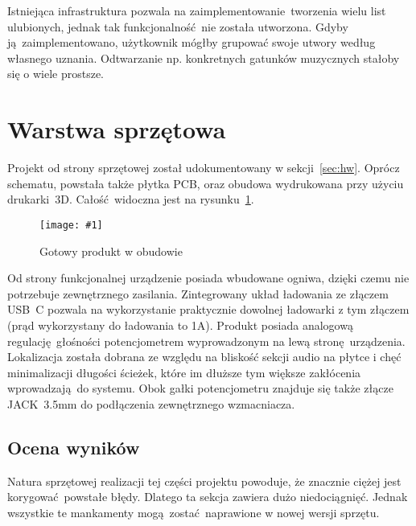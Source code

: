\documentclass[polish]{aghengthesis}
\newcommand{\imgint}[4]{
	\begin{figure}[{#4}]
		\centering
		\texttt{[image: \#1]}
		\caption{#2}
		\label{#1}
	\end{figure}
}
\newcommand{\imgh}[3]{\imgint{#1}{#2}{#3}{H}}
\begin{document}
			Istniejąca infrastruktura pozwala na zaimplementowanie tworzenia wielu list ulubionych, jednak tak funkcjonalność nie została utworzona. Gdyby ją zaimplementowano, użytkownik mógłby grupować swoje utwory według własnego uznania. Odtwarzanie np. konkretnych gatunków muzycznych stałoby się o wiele prostsze.
			
	\section{Warstwa sprzętowa}
		Projekt od strony sprzętowej został udokumentowany w sekcji~\ref{sec:hw}. Oprócz schematu, powstała także płytka PCB, oraz obudowa wydrukowana przy użyciu drukarki~3D. Całość widoczna jest na rysunku~\ref{5/hw_result}.
		
		\imgh{5/hw_result}{Gotowy produkt w obudowie}{0.7}
		
		Od strony funkcjonalnej urządzenie posiada wbudowane ogniwa, dzięki czemu nie potrzebuje zewnętrznego zasilania. Zintegrowany układ ładowania ze złączem USB~C pozwala na wykorzystanie praktycznie dowolnej ładowarki z tym złączem (prąd wykorzystany do ładowania to 1A). Produkt posiada analogową regulację głośności potencjometrem wyprowadzonym na lewą stronę urządzenia. Lokalizacja została dobrana ze względu na bliskość sekcji audio na płytce i chęć minimalizacji długości ścieżek, które im dłuższe tym większe zakłócenia wprowadzają do systemu. Obok gałki potencjometru znajduje się także złącze JACK~3.5mm do podłączenia zewnętrznego wzmacniacza.
		
		\subsection{Ocena wyników}
			Natura sprzętowej realizacji tej części projektu powoduje, że znacznie ciężej jest korygować powstałe błędy. Dlatego ta sekcja zawiera dużo niedociągnięć. Jednak wszystkie te mankamenty mogą zostać naprawione w nowej wersji sprzętu.
			
\end{document}
